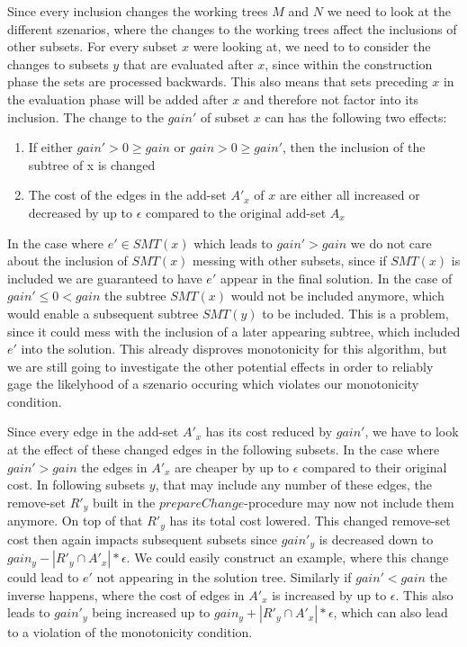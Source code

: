Since every inclusion changes the working trees $M$ and $N$ we need to look at the different szenarios, where the changes to the working trees affect the inclusions of other subsets. For every subset $x$ were looking at, we need to to consider the changes to subsets $y$ that are evaluated after $x$, since within the construction phase the sets are processed backwards. This also means that sets preceding $x$ in the evaluation phase will be added after $x$ and therefore not factor into its inclusion.
The change to the $gain'$ of subset $x$ can has the following two effects:
\begin{enumerate}
\item If either $gain'>0\geq gain$ or $gain>0\geq gain'$, then the inclusion of the subtree of x is changed
\item The cost of the edges in the add-set $A'_x$ of $x$ are either all increased or decreased by up to $\epsilon$ compared to the original add-set $A_x$
\end{enumerate}
In the case where $e'\in SMT(x)$ which leads to $gain'>gain$ we do not care about the inclusion of $SMT(x)$ messing with other subsets, since if $SMT(x)$ is included we are guaranteed to have $e'$ appear in the final solution. In the case of $gain'\leq 0<gain$ the subtree $SMT(x)$ would not be included anymore, which would enable a subsequent subtree $SMT(y)$ to be included. This is a problem, since it could mess with the inclusion of a later appearing subtree, which included $e'$ into the solution. This already disproves monotonicity for this algorithm, but we are still going to investigate the other potential effects in order to reliably gage the likelyhood of a szenario occuring which violates our monotonicity condition.

Since every edge in the add-set $A'_x$ has its cost reduced by $gain'$, we have to look at the effect of these changed edges in the following subsets. In the case where $gain'>gain$ the edges in $A'_x$ are cheaper by up to $\epsilon$ compared to their original cost. In following subsets $y$, that may include any number of these edges, the remove-set $R'_y$ built in the $prepareChange$-procedure may now not include them anymore. On top of that $R'_y$ has its total cost lowered. This changed remove-set cost then again impacts subsequent subsets since $gain'_y$ is decreased down to $gain_y-|R'_y\cap A'_x|*\epsilon$. We could easily construct an example, where this change could lead to $e'$ not appearing in the solution tree. Similarly if $gain'<gain$ the inverse happens, where the cost of edges in $A'_x$ is increased by up to $\epsilon$. This also leads to $gain'_y$ being increased up to $gain_y+|R'_y\cap A'_x|*\epsilon$, which can also lead to a violation of the monotonicity condition.

